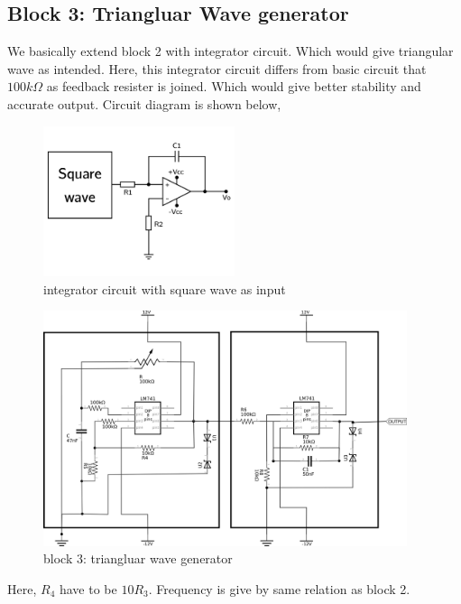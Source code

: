 \documentclass[14pt,a4paper]{extarticle}
\begin{document}
\subsection{Block 3: Triangluar Wave generator}
\label{sec:orgd345d61}

We basically extend block 2 with integrator circuit. Which would give triangular wave as intended. Here, this integrator circuit differs from basic circuit that \(100k\Omega\) as feedback resister is joined. Which would give better stability and accurate output. Circuit diagram is shown below,


\begin{figure}[H]
    \centering
    \label{triang}
    \includegraphics[width=0.5\textwidth]{imgs/triang.png}
    \caption{integrator circuit with square wave as input}
\end{figure}

\begin{figure}[H]
    \centering
    \label{tringularreal}
    \includegraphics[width=0.95\textwidth]{imgs/triangreal.png}
    \caption{block 3: triangluar wave generator}
\end{figure}

Here, \(R_{4}\) have to be \(10R_{3}\). Frequency is give by same relation as block 2.
\end{document}

